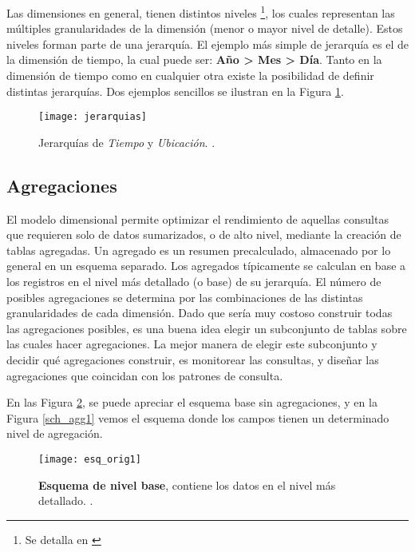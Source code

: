 \documentclass[a4paper,11pt]{article}
\begin{document}
    Las dimensiones en general, tienen distintos niveles \footnote{Se detalla en \cite[p.~94]{olap_solutions}}, los cuales representan las
    múltiples granularidades de la dimensión (menor o mayor nivel de detalle). Estos niveles forman parte de una jerarquía. El ejemplo más simple de
    jerarquía es el de la dimensión de tiempo, la cual puede ser: \textbf{Año > Mes > Día}. Tanto en la dimensión de
    tiempo como en cualquier otra existe la posibilidad de definir distintas jerarquías. Dos ejemplos sencillos se ilustran en la Figura
    \ref{jerarquías}.
    
    \begin{figure}
      \begin{center}
        \texttt{[image: jerarquias]}
        \caption{Jerarquías de \textit{Tiempo} y \textit{Ubicación}. \cite[p.~94]{olap_solutions}.}
        \label{jerarquías}
      \end{center}
    \end{figure}
    
    
    \subsection{Agregaciones} \label{agregaciones}
    
    El modelo dimensional permite optimizar el rendimiento de aquellas consultas que requieren solo de datos sumarizados, o de alto nivel,
    mediante la creación de tablas agregadas.
    Un agregado es un resumen precalculado, almacenado por lo general en un esquema separado. Los agregados típicamente se calculan en base
    a los registros en el nivel más detallado (o base) de su jerarquía.
    El número de posibles agregaciones se determina por las combinaciones de las distintas granularidades de cada dimensión.
    Dado que sería muy costoso construir todas las agregaciones  posibles, es una buena idea elegir un subconjunto de tablas sobre las cuales
    hacer agregaciones. La mejor manera de elegir este subconjunto y decidir qué  agregaciones construir, es monitorear las consultas, y diseñar
    las agregaciones que coincidan con los patrones de consulta.
    
    En las Figura \ref{sch_orig1}, se puede apreciar el esquema base sin agregaciones, y en la Figura \ref{sch_agg1} vemos el esquema
    donde los campos tienen un determinado nivel de agregación.
    
    \begin{figure}
      \begin{center}
        \texttt{[image: esq\_orig1]}
        \caption{\textbf{Esquema de nivel base}, contiene los datos en el nivel más detallado. \cite[p.~172]{nagabhushana}.}
        \label{sch_orig1}
      \end{center}
    \end{figure}
    
\end{document}
